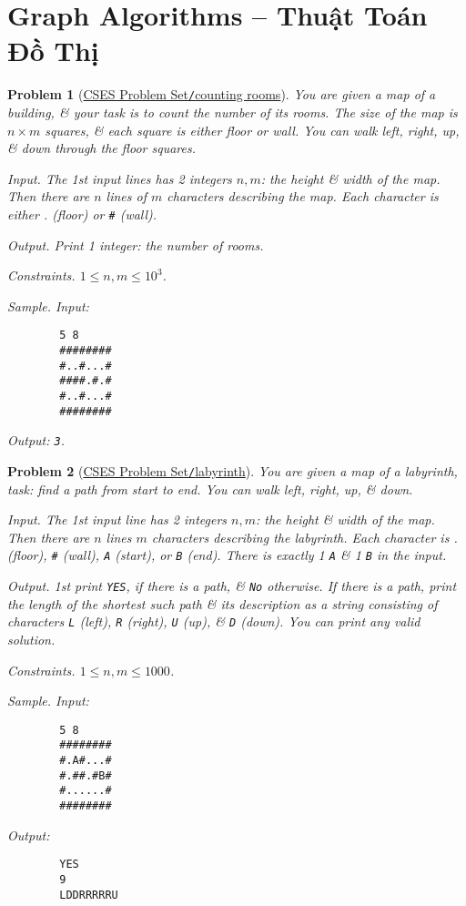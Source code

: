 \documentclass{article}
\newtheorem{problem}{Problem}
\begin{document}

\section{Graph Algorithms -- Thuật Toán Đồ Thị}

\begin{problem}[\href{https://cses.fi/problemset/task/1192}{CSES Problem Set{\tt/}counting rooms}]
	You are given a map of a building, \& your task is to count the number of its rooms. The size of the map is $n\times m$ squares, \& each square is either floor or wall. You can walk left, right, up, \& down through the floor squares.
	\item {\sf Input.} The 1st input lines has 2 integers $n,m$: the height \& width of the map. Then there are $n$ lines of $m$ characters describing the map. Each character is either . (floor) or {\tt\#} (wall).
	\item {\it Output.} Print 1 integer: the number of rooms.
	\item {\sf Constraints.} $1\le n,m\le10^3$.
	\item {\sf Sample.} Input:
	\begin{verbatim}
		5 8
		########
		#..#...#
		####.#.#
		#..#...#
		########		
	\end{verbatim}
	Output: {\tt3}.
\end{problem}

\begin{problem}[\href{https://cses.fi/problemset/task/1193}{CSES Problem Set{\tt/}labyrinth}]
	You are given a map of a labyrinth, task: find a path from start to end. You can walk left, right, up, \& down.
	\item {\sf Input.} The 1st input line has 2 integers $n,m$: the height \& width of the map. Then there are $n$ lines $m$ characters describing the labyrinth. Each character is . (floor), {\tt\#} (wall), {\tt A} (start), or {\tt B} (end). There is exactly 1 {\tt A} \& 1 {\tt B} in the input.
	\item {\sf Output.} 1st print {\tt YES}, if there is a path, \& {\tt No} otherwise. If there is a path, print the length of the shortest such path \& its description as a string consisting of characters {\tt L} (left), {\tt R} (right), {\tt U} (up), \& {\tt D} (down). You can print any valid solution.
	\item {\sf Constraints.} $1\le n,m\le1000$.
	\item {\sf Sample.} Input:
	\begin{verbatim}
		5 8
		########
		#.A#...#
		#.##.#B#
		#......#
		########
	\end{verbatim}
	Output:
	\begin{verbatim}
		YES
		9
		LDDRRRRRU
	\end{verbatim}
\end{problem}
\end{document}
